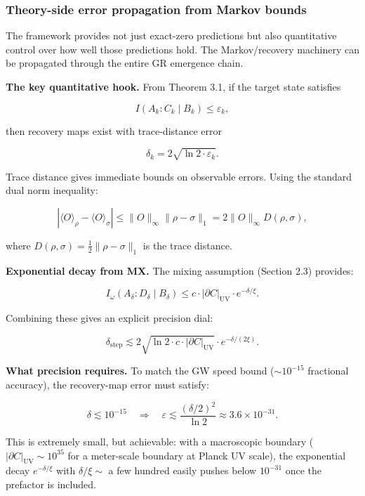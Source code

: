 \documentclass[11pt,a4paper]{article}
\theoremstyle{remark}
\begin{document}
\subsubsection{Theory-side error propagation from Markov bounds}\label{theory-side-error-propagation-from-markov-bounds}

The framework provides not just exact-zero predictions but also quantitative
control over how well those predictions hold. The Markov/recovery machinery
can be propagated through the entire GR emergence chain.

\textbf{The key quantitative hook.} From Theorem 3.1, if the target state satisfies

\[
I(A_k : C_k \mid B_k) \le \varepsilon_k,
\]

then recovery maps exist with trace-distance error

\[
\delta_k = 2\sqrt{\ln 2 \cdot \varepsilon_k}.
\]

Trace distance gives immediate bounds on observable errors. Using the
standard dual norm inequality:

\[
|\langle O \rangle_\rho - \langle O \rangle_\sigma|
\le \|O\|_\infty \|\rho - \sigma\|_1 = 2 \|O\|_\infty D(\rho, \sigma),
\]

where \(D(\rho, \sigma) = \frac{1}{2}\|\rho - \sigma\|_1\) is the trace distance.

\textbf{Exponential decay from MX.} The mixing assumption (Section 2.3) provides:

\[
I_\omega(A_\delta : D_\delta \mid B_\delta)
\le c \cdot |\partial C|_{\mathrm{UV}} \cdot e^{-\delta/\xi}.
\]

Combining these gives an explicit precision dial:

\[
\delta_{\mathrm{step}} \lesssim 2\sqrt{\ln 2 \cdot c \cdot |\partial C|_{\mathrm{UV}}}
\cdot e^{-\delta/(2\xi)}.
\]

\textbf{What precision requires.} To match the GW speed bound (\(\sim 10^{-15}\)
fractional accuracy), the recovery-map error must satisfy:

\[
\delta \lesssim 10^{-15}
\quad \Rightarrow \quad
\varepsilon \lesssim \frac{(\delta/2)^2}{\ln 2} \approx 3.6 \times 10^{-31}.
\]

This is extremely small, but achievable: with a macroscopic boundary
(\(|\partial C|_{\mathrm{UV}} \sim 10^{35}\) for a meter-scale boundary at Planck UV
scale), the exponential decay \(e^{-\delta/\xi}\) with \(\delta/\xi \sim\) a few
hundred easily pushes below \(10^{-31}\) once the prefactor is included.
\end{document}
